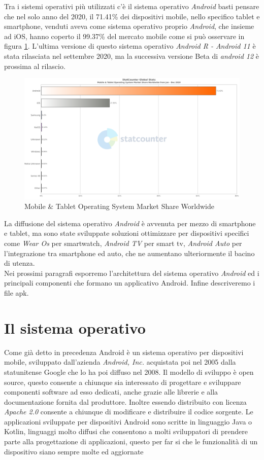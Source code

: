 Tra i sistemi operativi più utilizzati c'è il sistema operativo \textit{Android} basti pensare che nel solo anno del 2020, il 71.41\% dei dispositivi mobile, nello specifico tablet e smartphone, venduti aveva come sistema operativo proprio \textit{Android}, che insieme ad iOS, hanno coperto il 99.37\% del mercato mobile come si può osservare in figura \ref{fig:ww-sel}. L'ultima versione di questo sistema operativo \textit{Android R - Android 11} è stata rilasciata nel settembre 2020, ma la successiva versione Beta di \textit{android 12} è prossima al rilascio. 
\begin{figure}[h]
\centering 
\includegraphics[width=0.7\linewidth]{imgs/capitolo2/intro/StatCounter-os_combined-ww-monthly-202001-202012-bar.png}
\caption{Mobile \& Tablet Operating System Market Share Worldwide} 
\label{fig:ww-sel} 
\end{figure}
\FloatBarrier
 La diffusione del sistema operativo \textit{Android} è avvenuta per mezzo di smartphone e tablet, ma sono state sviluppate soluzioni ottimizzare per dispositivi specifici come \textit{Wear Os} per smartwatch, \textit{Android TV} per smart tv, \textit{Android Auto} per l'integrazione tra smartphone ed auto, che ne aumentano ulteriormente il bacino di utenza. 
\\
Nei prossimi paragrafi esporremo l'architettura del sistema operativo \textit{Android} ed i principali componenti che formano un applicativo Android. Infine descriveremo i file apk.  


\section{Il sistema operativo}
\label{sec:Il sistema operativo}
Come già detto in precedenza Android è un sistema operativo per dispositivi mobile, sviluppato dall'azienda \textit{Android, Inc.} acquistata poi nel 2005 dalla statunitense Google che lo ha poi diffuso nel 2008. Il modello di sviluppo è open source, questo consente a chiunque sia interessato di progettare e sviluppare componenti software ad esso dedicati, anche grazie alle librerie e alla documentazione fornita dal produttore. Inoltre essendo distribuito con licenza \textit{Apache 2.0} consente a chiunque di modificare e distribuire il codice sorgente. Le applicazioni sviluppate per dispositivi Android sono scritte in linguaggio Java o Kotlin, linguaggi molto diffusi che consentono a molti sviluppatori di prendere parte alla progettazione di applicazioni, questo per far si che le funzionalità di un dispositivo siano sempre molte ed aggiornate  

